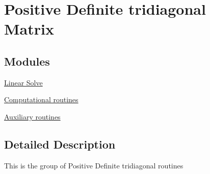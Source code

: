 \hypertarget{group__PT}{}\section{Positive Definite tridiagonal Matrix}
\label{group__PT}
\subsection*{Modules}
\begin{DoxyCompactItemize}
\item 
\hyperlink{group__solvePT}{Linear Solve}
\item 
\hyperlink{group__computationalPT}{Computational routines}
\item 
\hyperlink{group__auxiliaryPT}{Auxiliary routines}
\end{DoxyCompactItemize}


\subsection{Detailed Description}
This is the group of Positive Definite tridiagonal routines 